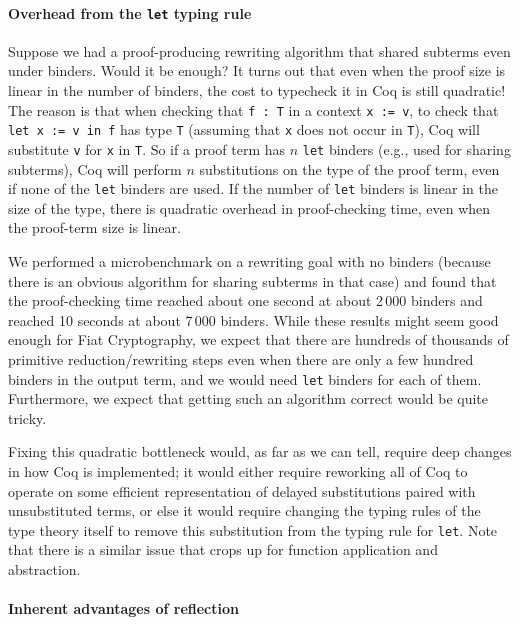 \paragraph{Overhead from the \texttt{let} typing rule}

Suppose we had a proof-producing rewriting algorithm that shared subterms even under binders.
Would it be enough?
It turns out that even when the proof size is linear in the number of binders, the cost to typecheck it in Coq is still quadratic!
The reason is that when checking that \texttt{f : T} in a context \texttt{x := v}, to check that \texttt{let x := v in f} has type \texttt{T} (assuming that \texttt{x} does not occur in \texttt{T}), Coq will substitute \texttt{v} for \texttt{x} in \texttt{T}.
So if a proof term has $n$ \texttt{let} binders (e.g., used for sharing subterms), Coq will perform $n$ substitutions on the type of the proof term, even if none of the \texttt{let} binders are used.
If the number of \texttt{let} binders is linear in the size of the type, there is quadratic overhead in proof-checking time, even when the proof-term size is linear.

We performed a microbenchmark on a rewriting goal with no binders (because there is an obvious algorithm for sharing subterms in that case) and found that the proof-checking time reached about one second at about 2\,000 binders and reached 10 seconds at about 7\,000 binders.
While these results might seem good enough for Fiat Cryptography, we expect that there are hundreds of thousands of primitive reduction/rewriting steps even when there are only a few hundred binders in the output term, and we would need \texttt{let} binders for each of them.
Furthermore, we expect that getting such an algorithm correct would be quite tricky.

Fixing this quadratic bottleneck would, as far as we can tell, require deep changes in how Coq is implemented; it would either require reworking all of Coq to operate on some efficient representation of delayed substitutions paired with unsubstituted terms, or else it would require changing the typing rules of the type theory itself to remove this substitution from the typing rule for \texttt{let}.
Note that there is a similar issue that crops up for function application and abstraction.

\paragraph{Inherent advantages of reflection}

